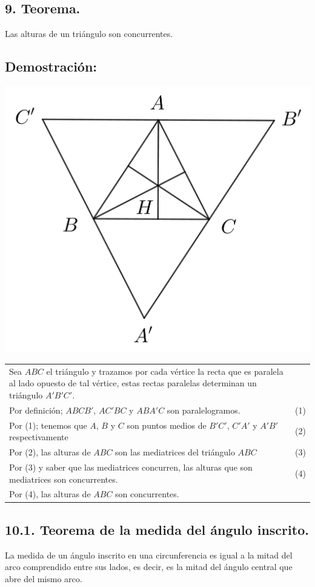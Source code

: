 \documentclass[12pt,a4paper]{article}
\begin{document}
\subsection*{9. Teorema.}
Las alturas de un triángulo son concurrentes.
\subsection*{Demostración:}
\begin{center}
\includegraphics[scale=0.6]{Imagenes/alturas.png} 
\end{center}
\begin{tabular}{p{15.9cm}p{1cm}}
Sea $ABC$ el triángulo y trazamos por cada vértice la recta que es paralela al lado opuesto de tal vértice, estas rectas paralelas determinan un triángulo $A'B'C'$.
\\Por definición; $ABCB'$, $AC'BC$ y $ABA'C$ son paralelogramos. &(1) 
\\Por (1); tenemos que $A$, $B$ y $C$ son puntos medios de $B'C'$,  $C'A'$ y $A'B'$ respectivamente& (2)
\\Por (2), las alturas de $ABC$ son las mediatrices del triángulo $ABC$ &(3)
\\Por (3) y saber que las mediatrices concurren, las alturas que son mediatrices son concurrentes. &\medskip(4)
\\Por (4), las alturas de $ABC$ son concurrentes.
\end{tabular}
\subsection*{10.1. Teorema de la medida del ángulo inscrito.}
La medida de un ángulo inscrito en una circunferencia es igual a la mitad del arco comprendido entre sus lados, es decir, es la mitad del ángulo central que abre del mismo arco.
\end{document}
